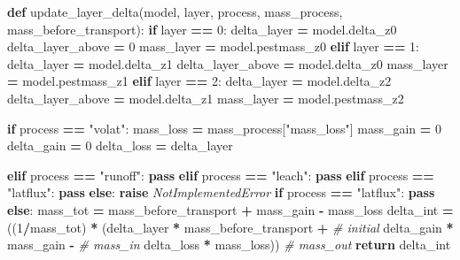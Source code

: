 \documentclass[]{article}
\newenvironment{Shaded}{\begin{snugshade}}{\end{snugshade}}
\newcommand{\KeywordTok}[1]{\textcolor[rgb]{0.13,0.29,0.53}{\textbf{#1}}}
\newcommand{\DecValTok}[1]{\textcolor[rgb]{0.00,0.00,0.81}{#1}}
\newcommand{\StringTok}[1]{\textcolor[rgb]{0.31,0.60,0.02}{#1}}
\newcommand{\CommentTok}[1]{\textcolor[rgb]{0.56,0.35,0.01}{\textit{#1}}}
\newcommand{\ControlFlowTok}[1]{\textcolor[rgb]{0.13,0.29,0.53}{\textbf{#1}}}
\newcommand{\OperatorTok}[1]{\textcolor[rgb]{0.81,0.36,0.00}{\textbf{#1}}}
\newcommand{\PreprocessorTok}[1]{\textcolor[rgb]{0.56,0.35,0.01}{\textit{#1}}}
\newcommand{\NormalTok}[1]{#1}
\begin{document}
\begin{Shaded}
\begin{Highlighting}[]
\KeywordTok{def}\NormalTok{ update_layer_delta(model, layer, process, mass_process, mass_before_transport):}
    \ControlFlowTok{if}\NormalTok{ layer }\OperatorTok{==} \DecValTok{0}\NormalTok{:}
\NormalTok{      delta_layer }\OperatorTok{=}\NormalTok{ model.delta_z0}
\NormalTok{      delta_layer_above }\OperatorTok{=} \DecValTok{0}
\NormalTok{      mass_layer }\OperatorTok{=}\NormalTok{ model.pestmass_z0}
    \ControlFlowTok{elif}\NormalTok{ layer }\OperatorTok{==} \DecValTok{1}\NormalTok{:}
\NormalTok{        delta_layer }\OperatorTok{=}\NormalTok{ model.delta_z1}
\NormalTok{        delta_layer_above }\OperatorTok{=}\NormalTok{ model.delta_z0}
\NormalTok{        mass_layer }\OperatorTok{=}\NormalTok{ model.pestmass_z1}
    \ControlFlowTok{elif}\NormalTok{ layer }\OperatorTok{==} \DecValTok{2}\NormalTok{:}
\NormalTok{        delta_layer }\OperatorTok{=}\NormalTok{ model.delta_z2}
\NormalTok{        delta_layer_above }\OperatorTok{=}\NormalTok{ model.delta_z1}
\NormalTok{        mass_layer }\OperatorTok{=}\NormalTok{ model.pestmass_z2}
        
    \ControlFlowTok{if}\NormalTok{ process }\OperatorTok{==} \StringTok{"volat"}\NormalTok{:}
\NormalTok{        mass_loss }\OperatorTok{=}\NormalTok{ mass_process[}\StringTok{"mass_loss"}\NormalTok{]}
\NormalTok{        mass_gain }\OperatorTok{=} \DecValTok{0}
\NormalTok{        delta_gain }\OperatorTok{=} \DecValTok{0}
\NormalTok{        delta_loss }\OperatorTok{=}\NormalTok{ delta_layer}
        
    \ControlFlowTok{elif}\NormalTok{ process }\OperatorTok{==} \StringTok{"runoff"}\NormalTok{:}
        \ControlFlowTok{pass}
    \ControlFlowTok{elif}\NormalTok{ process }\OperatorTok{==} \StringTok{"leach"}\NormalTok{:}
        \ControlFlowTok{pass}
    \ControlFlowTok{elif}\NormalTok{ process }\OperatorTok{==} \StringTok{"latflux"}\NormalTok{:}
        \ControlFlowTok{pass}
    \ControlFlowTok{else}\NormalTok{:}
        \ControlFlowTok{raise} \PreprocessorTok{NotImplementedError}
    \ControlFlowTok{if}\NormalTok{ process }\OperatorTok{==} \StringTok{"latflux"}\NormalTok{:}
        \ControlFlowTok{pass}
    \ControlFlowTok{else}\NormalTok{:}
\NormalTok{        mass_tot }\OperatorTok{=}\NormalTok{ mass_before_transport }\OperatorTok{+}\NormalTok{ mass_gain }\OperatorTok{-}\NormalTok{ mass_loss}
\NormalTok{        delta_int }\OperatorTok{=}\NormalTok{ ((}\DecValTok{1}\OperatorTok{/}\NormalTok{mass_tot) }\OperatorTok{*}
\NormalTok{                     (delta_layer }\OperatorTok{*}\NormalTok{ mass_before_transport }\OperatorTok{+}  \CommentTok{# initial}
\NormalTok{                      delta_gain }\OperatorTok{*}\NormalTok{ mass_gain }\OperatorTok{-}  \CommentTok{# mass_in}
\NormalTok{                      delta_loss }\OperatorTok{*}\NormalTok{ mass_loss))  }\CommentTok{# mass_out}
    \ControlFlowTok{return}\NormalTok{ delta_int}
                       
\end{Highlighting}
\end{Shaded}
\end{document}
